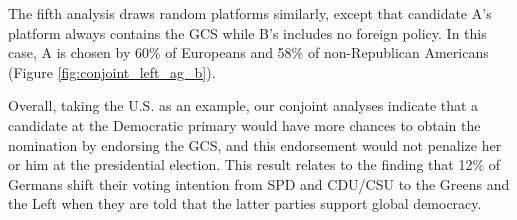 \begin{bibunit}
The fifth analysis draws random platforms similarly, except that candidate A's platform always contains the GCS while B's includes no foreign policy. In this case, A is chosen by 60\% of Europeans %
and 58\% of non-Republican Americans (Figure \ref{fig:conjoint_left_ag_b}). %

Overall, taking the U.S. as an example, our conjoint analyses indicate that a candidate at the Democratic primary would have more chances to obtain the nomination by endorsing the GCS, and this endorsement would not penalize her or him at the presidential election. 
This result relates to the finding that 12\% of Germans shift their voting intention from SPD and CDU/CSU to the Greens and the Left when they are told that the latter parties support global democracy.\citep{ghassim_who_2020}



\end{bibunit}
